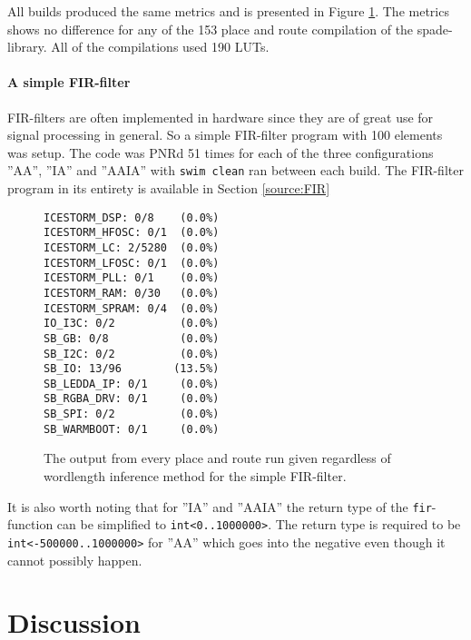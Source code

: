 \documentclass[msc,lith,english]{liuthesis}
\begin{document}
All builds produced the same metrics and is presented in Figure \ref{fig:SMDoutput}. The metrics shows no difference for any of the 153 place and route compilation of the spade-library. All of the compilations used 190 LUTs. 

\subsubsection{A simple FIR-filter}
FIR-filters are often implemented in hardware since they are of great use for signal processing in general. So a simple FIR-filter program with 100 elements was setup. The code was PNRd 51 times for each of the three configurations ''AA'', ''IA'' and ''AAIA'' with \verb+swim clean+ ran between each build. The FIR-filter program in its entirety is available in Section \ref{source:FIR}

\begin{figure}
\begin{center}
\begin{verbatim}
ICESTORM_DSP: 0/8    (0.0%)
ICESTORM_HFOSC: 0/1  (0.0%)
ICESTORM_LC: 2/5280  (0.0%)
ICESTORM_LFOSC: 0/1  (0.0%)
ICESTORM_PLL: 0/1    (0.0%)
ICESTORM_RAM: 0/30   (0.0%)
ICESTORM_SPRAM: 0/4  (0.0%)
IO_I3C: 0/2          (0.0%)
SB_GB: 0/8           (0.0%)
SB_I2C: 0/2          (0.0%)
SB_IO: 13/96        (13.5%)
SB_LEDDA_IP: 0/1     (0.0%)
SB_RGBA_DRV: 0/1     (0.0%)
SB_SPI: 0/2          (0.0%)
SB_WARMBOOT: 0/1     (0.0%)
\end{verbatim}
\end{center}

  \caption{The output from every place and route run given regardless of wordlength inference method for the simple FIR-filter.}
  \label{fig:SMDoutput}
\end{figure}

It is also worth noting that for ''IA'' and ''AAIA'' the return type of the \verb+fir+-function can be simplified to \verb+int<0..1000000>+. The return type is required to be \verb+int<-500000..1000000>+ for ''AA'' which goes into the negative even though it cannot possibly happen.


\chapter{Discussion}
\label{cha:Discussion}
\end{document}
